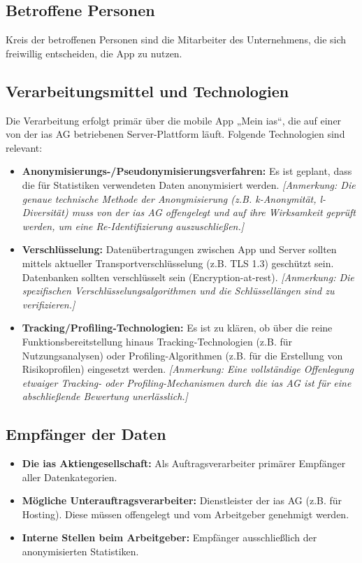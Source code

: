 \documentclass[12pt, a4paper]{article}
\begin{document}
\subsection{Betroffene Personen}
Kreis der betroffenen Personen sind die Mitarbeiter des Unternehmens, die sich freiwillig entscheiden, die App zu nutzen.

\subsection{Verarbeitungsmittel und Technologien}
Die Verarbeitung erfolgt primär über die mobile App „Mein ias“, die auf einer von der ias AG betriebenen Server-Plattform läuft. Folgende Technologien sind relevant:
\begin{itemize}
    \item \textbf{Anonymisierungs-/Pseudonymisierungsverfahren:} Es ist geplant, dass die für Statistiken verwendeten Daten anonymisiert werden. \textit{[Anmerkung: Die genaue technische Methode der Anonymisierung (z.B. k-Anonymität, l-Diversität) muss von der ias AG offengelegt und auf ihre Wirksamkeit geprüft werden, um eine Re-Identifizierung auszuschließen.]}
    \item \textbf{Verschlüsselung:} Datenübertragungen zwischen App und Server sollten mittels aktueller Transportverschlüsselung (z.B. TLS 1.3) geschützt sein. Datenbanken sollten verschlüsselt sein (Encryption-at-rest). \textit{[Anmerkung: Die spezifischen Verschlüsselungsalgorithmen und die Schlüssellängen sind zu verifizieren.]}
    \item \textbf{Tracking/Profiling-Technologien:} Es ist zu klären, ob über die reine Funktionsbereitstellung hinaus Tracking-Technologien (z.B. für Nutzungsanalysen) oder Profiling-Algorithmen (z.B. für die Erstellung von Risikoprofilen) eingesetzt werden. \textit{[Anmerkung: Eine vollständige Offenlegung etwaiger Tracking- oder Profiling-Mechanismen durch die ias AG ist für eine abschließende Bewertung unerlässlich.]}
\end{itemize}

\subsection{Empfänger der Daten}
\begin{itemize}
    \item \textbf{Die ias Aktiengesellschaft:} Als Auftragsverarbeiter primärer Empfänger aller Datenkategorien.
    \item \textbf{Mögliche Unterauftragsverarbeiter:} Dienstleister der ias AG (z.B. für Hosting). Diese müssen offengelegt und vom Arbeitgeber genehmigt werden.
    \item \textbf{Interne Stellen beim Arbeitgeber:} Empfänger ausschließlich der anonymisierten Statistiken.
\end{itemize}
\end{document}

